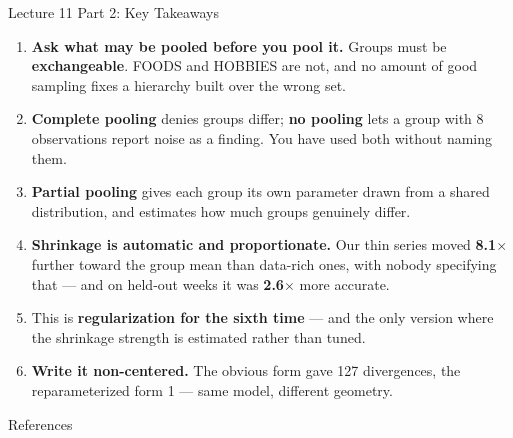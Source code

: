 \documentclass[aspectratio=169, 11pt]{beamer}
\begin{document}
\begin{frame}{Lecture 11 Part 2: Key Takeaways}
  \begin{keybox}
    {\footnotesize
    \begin{enumerate}\itemsep2pt
      \item \textbf{Ask what may be pooled before you pool it.} Groups must be
            \textbf{exchangeable}. FOODS and HOBBIES are not, and no amount of good sampling
            fixes a hierarchy built over the wrong set.

      \item \textbf{Complete pooling} denies groups differ; \textbf{no pooling} lets a group with
            8 observations report noise as a finding. You have used both without naming them.

      \item \textbf{Partial pooling} gives each group its own parameter drawn from a shared
            distribution, and estimates how much groups genuinely differ.

      \item \textbf{Shrinkage is automatic and proportionate.} Our thin series moved
            \textbf{8.1$\times$} further toward the group mean than data-rich ones, with nobody
            specifying that --- and on held-out weeks it was \textbf{2.6$\times$} more accurate.

      \item This is \textbf{regularization for the sixth time} --- and the only version where the
            shrinkage strength is estimated rather than tuned.

      \item \textbf{Write it non-centered.} The obvious form gave 127 divergences, the
            reparameterized form 1 --- same model, different geometry.
    \end{enumerate}
    }
  \end{keybox}
\end{frame}

\begin{frame}[allowframebreaks]{References}
  \printbibliography[heading=none]
\end{frame}
\end{document}

